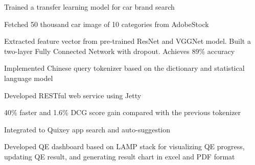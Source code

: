 \documentclass[letterpaper]{deedy-resume} %
\begin{document}
\begin{minipage}[t]{0.66\textwidth}
\sectionspace %

\begin{tightitemize}
\item Trained a transfer learning model for car brand search
\item Fetched 50 thousand car image of 10 categories from AdobeStock
\item Extracted feature vector from pre-trained ResNet and VGGNet model. Built a two-layer Fully Connected Network with dropout. Achieves 89\% accuracy
\end{tightitemize}

\sectionspace



\sectionspace

\begin{tightitemize}
\item Implemented Chinese query tokenizer based on the dictionary and statistical language model
\item Developed RESTful web service using Jetty
\item 40\% faster and 1.6\% DCG score gain compared with the previous tokenizer
\item Integrated to Quixey app search and auto-suggestion
\end{tightitemize}

\sectionspace %



\sectionspace

\begin{tightitemize}
\item Developed QE dashboard based on LAMP stack for visualizing QE progress, updating QE result, and generating result chart in excel and PDF format
\end{tightitemize}

\sectionspace %


\end{minipage} %
\end{document}
